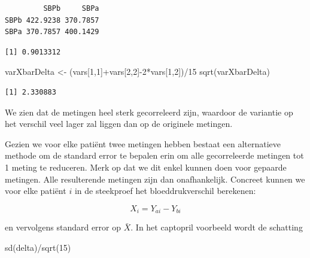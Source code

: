 \documentclass[
  dutch,
  letterpaper,
  12pt]{book}
\newenvironment{Shaded}{\begin{snugshade}}{\end{snugshade}}
\newcommand{\DecValTok}[1]{\textcolor[rgb]{0.68,0.00,0.00}{#1}}
\newcommand{\FunctionTok}[1]{\textcolor[rgb]{0.28,0.35,0.67}{#1}}
\newcommand{\NormalTok}[1]{\textcolor[rgb]{0.00,0.23,0.31}{#1}}
\newcommand{\OtherTok}[1]{\textcolor[rgb]{0.00,0.23,0.31}{#1}}
\newcommand{\SpecialCharTok}[1]{\textcolor[rgb]{0.37,0.37,0.37}{#1}}
\theoremstyle{definition}
\theoremstyle{definition}
\theoremstyle{definition}
\theoremstyle{remark}
\begin{document}
\begin{verbatim}
         SBPb     SBPa
SBPb 422.9238 370.7857
SBPa 370.7857 400.1429
\end{verbatim}

\begin{Shaded}
\end{Shaded}

\begin{verbatim}
[1] 0.9013312
\end{verbatim}

\begin{Shaded}
\begin{Highlighting}[]
\NormalTok{varXbarDelta }\OtherTok{\textless{}{-}}\NormalTok{ (vars[}\DecValTok{1}\NormalTok{,}\DecValTok{1}\NormalTok{]}\SpecialCharTok{+}\NormalTok{vars[}\DecValTok{2}\NormalTok{,}\DecValTok{2}\NormalTok{]}\SpecialCharTok{{-}}\DecValTok{2}\SpecialCharTok{*}\NormalTok{vars[}\DecValTok{1}\NormalTok{,}\DecValTok{2}\NormalTok{])}\SpecialCharTok{/}\DecValTok{15}
\FunctionTok{sqrt}\NormalTok{(varXbarDelta)}
\end{Highlighting}
\end{Shaded}

\begin{verbatim}
[1] 2.330883
\end{verbatim}

We zien dat de metingen heel sterk gecorreleerd zijn, waardoor de
variantie op het verschil veel lager zal liggen dan op de originele
metingen.

Gezien we voor elke patiënt twee metingen hebben bestaat een
alternatieve methode om de standard error te bepalen erin om alle
gecorreleerde metingen tot 1 meting te reduceren. Merk op dat we dit
enkel kunnen doen voor gepaarde metingen. Alle resulterende metingen
zijn dan onafhankelijk. Concreet kunnen we voor elke patiënt \(i\) in de
steekproef het bloeddrukverschil berekenen:

\[X_{i}=Y_{ai}-Y_{bi}\]

en vervolgens standard error op \(\bar X\). In het captopril voorbeeld
wordt de schatting

\begin{Shaded}
\begin{Highlighting}[]
\FunctionTok{sd}\NormalTok{(delta)}\SpecialCharTok{/}\FunctionTok{sqrt}\NormalTok{(}\DecValTok{15}\NormalTok{)}
\end{Highlighting}
\end{Shaded}
\end{document}
